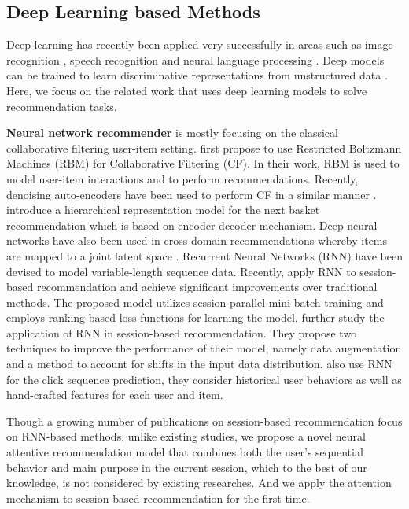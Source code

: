 \documentclass[sigconf]{acmart}
\begin{document}
\subsection{Deep Learning based Methods}
  
Deep learning has recently been applied very successfully in areas such as image recognition \cite{krizhevsky2012imagenet,he2016deep}, speech recognition \cite{graves2013speech,amodei2016deep,hinton2012deep} and neural language processing \cite{socher2011parsing,de2014Medical,rsoy2014deep,song2017summarizing,li2017salience}. Deep models can be trained to learn discriminative representations from unstructured data \cite{he2017neural,he2017neuralfact,li2017neural}. Here, we focus on the related work that uses deep learning models to solve recommendation tasks.
  
\textbf{Neural network recommender} is mostly focusing on the classical collaborative filtering user-item setting. \citet{salakhutdinov2007restricted} first propose to use Restricted Boltzmann Machines (RBM) for Collaborative Filtering (CF). In their work, RBM is used to model user-item interactions and to perform recommendations. Recently, denoising auto-encoders have been used to perform CF in a similar manner \cite{wu2016collaborative,sedhain2015autorec}. \citet{wang2015learning} introduce a hierarchical representation model for the next basket recommendation which is based on encoder-decoder mechanism. Deep neural networks have also been used in cross-domain recommendations whereby items are mapped to a joint latent space \cite{elkahky2015a}. Recurrent Neural Networks (RNN) have been devised to model variable-length sequence data. Recently, \citet{hidasi2015session} apply RNN to session-based recommendation and achieve significant improvements over traditional methods. The proposed model utilizes session-parallel mini-batch training and employs ranking-based loss functions for learning the model. \citet{tan2016improved} further study the application of RNN in session-based recommendation. They propose two techniques to improve the performance of their model, namely data augmentation and a method to account for shifts in the input data distribution. \citet{zhang2014sequential} also use RNN for the click sequence prediction, they consider historical user behaviors as well as hand-crafted features for each user and item.
  
Though a growing number of publications on session-based recommendation focus on RNN-based methods, unlike existing studies, we propose a novel neural attentive recommendation model that combines both the user's sequential behavior and main purpose in the current session, which to the best of our knowledge, is not considered by existing researches. And we apply the attention mechanism to session-based recommendation for the first time.
\end{document}
